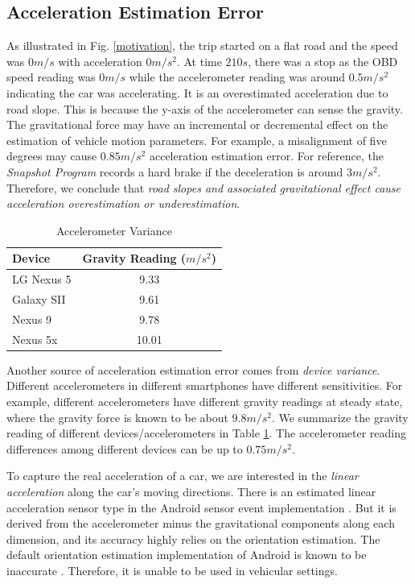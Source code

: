 \subsection{Acceleration Estimation Error}

As illustrated in Fig. \ref{motivation}, the trip started on a flat road
and the speed was $0m/s$ with acceleration $0m/s^2$. 
At time $210s$, there was a stop as the OBD speed reading was $0m/s$ 
while the accelerometer reading was around $0.5m/s^2$ indicating
the car was accelerating. It is an overestimated acceleration
due to road slope.
This is because the y-axis of the accelerometer can sense the gravity. 
The gravitational force may have an incremental or decremental effect
on the estimation of vehicle motion parameters. 
For example, a misalignment of five degrees may cause $0.85m/s^2$ 
acceleration estimation error.
For reference, the \emph{Snapshot Program} \cite{snapshot} records a hard brake if the deceleration is around $3m/s^2$.
Therefore, we conclude that \emph{road slopes and associated gravitational effect
cause acceleration overestimation or underestimation}. 


\begin{table}[!htbp]
\centering
    \caption[gravity]{Accelerometer Variance}
   \vspace{0.1cm}
    \label{gravity}
               \begin{tabular}{|l|c|}
 \hline
 Device & Gravity Reading ($m/s^2$) 
 \\  \hline      \hline
LG Nexus 5 & 9.33       
 \\  \hline
Galaxy SII & 9.61
 \\   \hline
Nexus 9 & 9.78
 \\  \hline
Nexus 5x & 10.01
 \\  \hline
 \end{tabular}
\end{table}


Another source of acceleration estimation error comes from \emph{device variance}.
Different accelerometers in different smartphones have different sensitivities.
For example, different accelerometers have different gravity readings at steady state, where the gravity force is known to be about $9.8m/s^2$.
We summarize the gravity reading of different devices/accelerometers 
in Table \ref{gravity}.
The accelerometer reading differences among different devices can be up to $0.75m/s^2$.


To capture the real acceleration of a car, we are interested in the
\emph{linear acceleration} along the car's moving directions.
There is an estimated linear acceleration sensor type in the
Android sensor event implementation \cite{androidsourcecode}. 
But it is derived from the accelerometer minus the gravitational components along each dimension,
and its accuracy highly relies on the orientation estimation.
The default orientation estimation implementation of Android is known to be inaccurate \cite{zhou2014use}.
Therefore, it is unable to be used in vehicular settings. 


